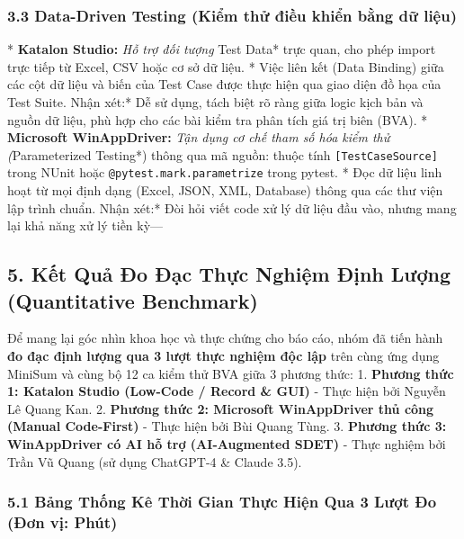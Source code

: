 \subsubsection{3.3 Data-Driven Testing (Kiểm thử điều khiển bằng dữ liệu)}
* \textbf{Katalon Studio:}
  \textit{ Hỗ trợ đối tượng }Test Data* trực quan, cho phép import trực tiếp từ Excel, CSV hoặc cơ sở dữ liệu.
  * Việc liên kết (Data Binding) giữa các cột dữ liệu và biến của Test Case được thực hiện qua giao diện đồ họa của Test Suite.
  \textit{ }Nhận xét:* Dễ sử dụng, tách biệt rõ ràng giữa logic kịch bản và nguồn dữ liệu, phù hợp cho các bài kiểm tra phân tích giá trị biên (BVA).
* \textbf{Microsoft WinAppDriver:}
  \textit{ Tận dụng cơ chế tham số hóa kiểm thử (}Parameterized Testing*) thông qua mã nguồn: thuộc tính \texttt{[TestCaseSource]} trong NUnit hoặc \texttt{@pytest.mark.parametrize} trong pytest.
  * Đọc dữ liệu linh hoạt từ mọi định dạng (Excel, JSON, XML, Database) thông qua các thư viện lập trình chuẩn.
  \textit{ }Nhận xét:* Đòi hỏi viết code xử lý dữ liệu đầu vào, nhưng mang lại khả năng xử lý tiền kỳ---

\subsection{5. Kết Quả Đo Đạc Thực Nghiệm Định Lượng (Quantitative Benchmark)}

Để mang lại góc nhìn khoa học và thực chứng cho báo cáo, nhóm đã tiến hành \textbf{đo đạc định lượng qua 3 lượt thực nghiệm độc lập} trên cùng ứng dụng MiniSum và cùng bộ 12 ca kiểm thử BVA giữa 3 phương thức:
1. \textbf{Phương thức 1: Katalon Studio (Low-Code / Record & GUI)} - Thực hiện bởi Nguyễn Lê Quang Kan.
2. \textbf{Phương thức 2: Microsoft WinAppDriver thủ công (Manual Code-First)} - Thực hiện bởi Bùi Quang Tùng.
3. \textbf{Phương thức 3: WinAppDriver có AI hỗ trợ (AI-Augmented SDET)} - Thực nghiệm bởi Trần Vũ Quang (sử dụng ChatGPT-4 & Claude 3.5).

\subsubsection{5.1 Bảng Thống Kê Thời Gian Thực Hiện Qua 3 Lượt Đo (Đơn vị: Phút)}

